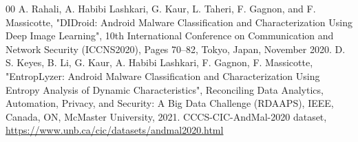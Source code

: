 \documentclass[conference]{IEEEtran}
\begin{document}


\begin{thebibliography}{00}
 A. Rahali, A. Habibi Lashkari, G. Kaur, L. Taheri, F. Gagnon, and F. Massicotte, "DIDroid: Android Malware Classification and Characterization Using Deep Image Learning", 10th International Conference on Communication and Network Security (ICCNS2020), Pages 70–82, Tokyo, Japan, November 2020.
 D. S. Keyes, B. Li, G. Kaur, A. Habibi Lashkari, F. Gagnon, F. Massicotte, "EntropLyzer: Android Malware Classification and Characterization Using Entropy Analysis of Dynamic Characteristics", Reconciling Data Analytics, Automation, Privacy, and Security: A Big Data Challenge (RDAAPS), IEEE, Canada, ON, McMaster University, 2021.
 CCCS-CIC-AndMal-2020 dataset, \url{https://www.unb.ca/cic/datasets/andmal2020.html}
\end{thebibliography}
\end{document}
